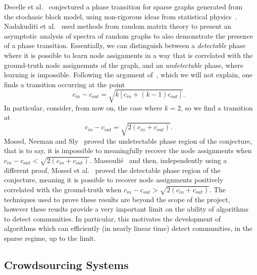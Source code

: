 \documentclass[12pt]{article}
\numberwithin{equation}{section}
\begin{document}
Decelle et al.~\cite{DKM+11} conjectured a phase transition for sparse graphs generated from the stochasic block model, using non-rigorous ideas from statistical physics~\cite{MNS12}. Nadakuditi et al.~\cite{NN12} used methods from random matrix theory to present an asymptotic analysis of spectra of random graphs to also demonstrate the presence of a phase transition. Essentially, we can distinguish between a \textsl{detectable} phase where it is possible to learn node assignments in a way that is correlated with the ground-truth node assignemnts of the graph, and an \textsl{undetectable} phase, where learning is impossible. Following the argument of~\cite{NN12}, which we will not explain, one finds a transition occurring at the point
\begin{equation}
\label{eq:phaseTransitionK}
 c_{in} - c_{out} = \sqrt{k[c_{in} + (k-1)c_{out}]}.
\end{equation}
In particular, consider, from now on, the case where $k = 2$, so we find a transition at
\begin{equation}
\label{eq:phaseTransitionK}
 c_{in} - c_{out} = \sqrt{2(c_{in} + c_{out})}.
\end{equation}
Mossel, Neeman and Sly~\cite{MNS12} proved the undetectable phase region of the conjecture, that is to say, it is impossible to meaningfully recover the node assignments when $ c_{in} - c_{out} < \sqrt{2(c_{in} + c_{out})}$. Massouli\'e~\cite{Mas13} and then, independently using a different proof, Mossel et al.~\cite{MNS13b} proved the detectable phase region of the conjecture, meaning it is possible to recover node assignments positively correlated with the ground-truth when $ c_{in} - c_{out} > \sqrt{2(c_{in} + c_{out})}$. The techniques used to prove these results are beyond the scope of the project, however these reuslts provide a very important limit on the ability of algorithms to detect communities. In particular, this motivates the development of algorithms which can efficiently (in nearly linear time) detect communities, in the sparse regime, up to the limit.

\subsection{Crowdsourcing Systems}
\label{sec:background;subsec:crowdsourcingSystems}

\end{document}
